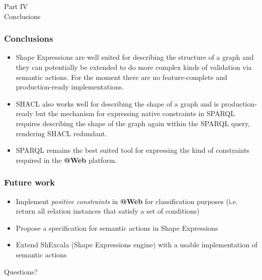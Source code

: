 \documentclass{beamer}
\makeatletter
\newcommand{\atweb}{\textbf{@Web}\xspace}
\newcommand{\partslide}[2]{
  \begin{center}
    \LARGE{#1} \\
    \vspace{0.5cm}
    \huge{#2}
  \end{center}
}
\makeatother
\begin{document}

\begin{frame}
  \partslide{Part IV}{Conclusions}
\end{frame}

\begin{frame}
  \frametitle{Conclusions}

  \begin{itemize}
    \item Shape Expressions are well suited for describing the structure of a
      graph and they can potentially be extended to do more complex kinds of
      validation via semantic actions. For the moment there are no
      feature-complete and production-ready implementations.

    \item SHACL also works well for describing the shape of a graph and is
      production-ready but the mechanism for expressing native constraints in
      SPARQL requires describing the shape of the graph again within the SPARQL
      query, rendering SHACL redundant.

    \item SPARQL remains the best suited tool for expressing the kind of
      constraints required in the \atweb platform.
  \end{itemize}
\end{frame}

\begin{frame}
  \frametitle{Future work}

  \begin{itemize}
    \item Implement \textit{positive constraints} in \atweb for classification
      purposes (i.e. return all relation instances that satisfy a set of
      conditions)

    \item Propose a specification for semantic actions in Shape Expressions

    \item Extend ShExcala (Shape Expressions engine) with a usable
      implementation of semantic actions
  \end{itemize}
\end{frame}

\begin{frame}
  \begin{center}
    \Huge{Questions?}
  \end{center}
\end{frame}
\end{document}
